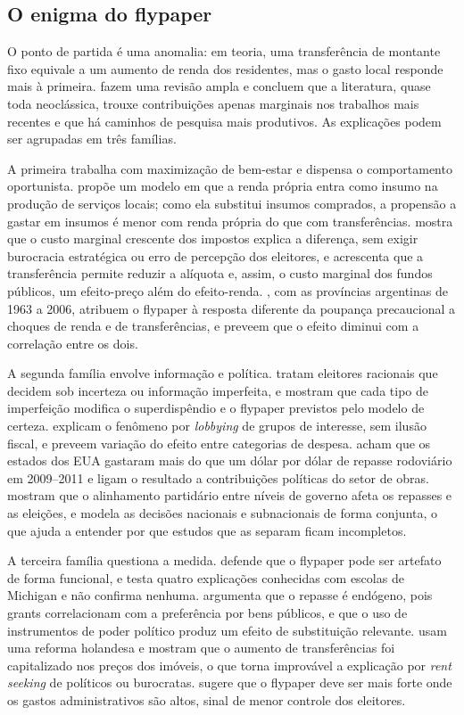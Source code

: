 \documentclass[10pt,twocolumn]{article}
\begin{document}
\subsection{O enigma do flypaper}
O ponto de partida é uma anomalia: em teoria, uma transferência de montante fixo equivale a um aumento de renda dos residentes, mas o gasto local responde mais à primeira. \citet{bailey1998} fazem uma revisão ampla e concluem que a literatura, quase toda neoclássica, trouxe contribuições apenas marginais nos trabalhos mais recentes e que há caminhos de pesquisa mais produtivos. As explicações podem ser agrupadas em três famílias.

A primeira trabalha com maximização de bem-estar e dispensa o comportamento oportunista. \citet{hamilton1983} propõe um modelo em que a renda própria entra como insumo na produção de serviços locais; como ela substitui insumos comprados, a propensão a gastar em insumos é menor com renda própria do que com transferências. \citet{hamilton1986} mostra que o custo marginal crescente dos impostos explica a diferença, sem exigir burocracia estratégica ou erro de percepção dos eleitores, e \citet{dahlby2011} acrescenta que a transferência permite reduzir a alíquota e, assim, o custo marginal dos fundos públicos, um efeito-preço além do efeito-renda. \citet{vegh2015}, com as províncias argentinas de 1963 a 2006, atribuem o flypaper à resposta diferente da poupança precaucional a choques de renda e de transferências, e preveem que o efeito diminui com a correlação entre os dois.

A segunda família envolve informação e política. \citet{turnbull1992,turnbull1998} tratam eleitores racionais que decidem sob incerteza ou informação imperfeita, e mostram que cada tipo de imperfeição modifica o superdispêndio e o flypaper previstos pelo modelo de certeza. \citet{dougan1988} explicam o fenômeno por \textit{lobbying} de grupos de interesse, sem ilusão fiscal, e preveem variação do efeito entre categorias de despesa. \citet{leduc2017} acham que os estados dos EUA gastaram mais do que um dólar por dólar de repasse rodoviário em 2009--2011 e ligam o resultado a contribuições políticas do setor de obras. \citet{bracco2015} mostram que o alinhamento partidário entre níveis de governo afeta os repasses e as eleições, e \citet{volden2007} modela as decisões nacionais e subnacionais de forma conjunta, o que ajuda a entender por que estudos que as separam ficam incompletos.

A terceira família questiona a medida. \citet{becker1996} defende que o flypaper pode ser artefato de forma funcional, e \citet{wyckoff1991} testa quatro explicações conhecidas com escolas de Michigan e não confirma nenhuma. \citet{knight2002} argumenta que o repasse é endógeno, pois grants correlacionam com a preferência por bens públicos, e que o uso de instrumentos de poder político produz um efeito de substituição relevante. \citet{allers2016} usam uma reforma holandesa e mostram que o aumento de transferências foi capitalizado nos preços dos imóveis, o que torna improvável a explicação por \textit{rent seeking} de políticos ou burocratas. \citet{strumpf1998} sugere que o flypaper deve ser mais forte onde os gastos administrativos são altos, sinal de menor controle dos eleitores.
\end{document}
